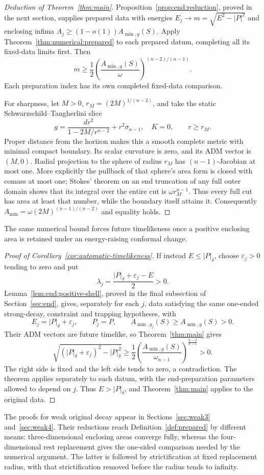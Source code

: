 \begin{proof}[Deduction of Theorem~\ref{thm:main}]
Proposition~\ref{prop:end:reduction}, proved in the next section,
supplies prepared data with energies $E_j\to
m=\sqrt{E^2-|P|^2}$ and enclosing infima
$A_j\ge(1-o(1))A_{\min,g}(S)$. Apply
Theorem~\ref{thm:numerical:prepared} to each prepared datum,
completing all its fixed-data limits first. Then
\[
 m\ge\frac12\left(\frac{A_{\min,g}(S)}\omega\right)^{(n-2)/(n-1)}.
\]
Each preparation index has its own completed fixed-data comparison.

For sharpness, let $M>0$, $r_M=(2M)^{1/(n-2)}$, and take the static
Schwarzschild--Tangherlini slice
\[
 g=\frac{dr^2}{1-2M/r^{n-2}}+r^2\sigma_{n-1},\quad K=0,
 \qquad r\ge r_M.
\]
Proper distance from the horizon makes this a smooth complete metric
with minimal compact boundary. Its scalar curvature is zero, and its
ADM vector is $(M,0)$. Radial projection to the sphere of radius $r_M$
has $(n-1)$-Jacobian at most one. More explicitly the pullback of that
sphere's area form is closed with comass at most one; Stokes' theorem
on an end truncation of any full outer domain shows that its integral
over the entire cut is $\omega r_M^{n-1}$. Thus every full cut has area
at least that number, while the boundary itself attains it. Consequently
$A_{\min}=\omega(2M)^{(n-1)/(n-2)}$ and equality holds.
\end{proof}

The same numerical bound forces future timelikeness once a positive
enclosing area is retained under an energy-raising conformal change.

\begin{proof}[Proof of Corollary~\ref{cor:automatic-timelikeness}]
If instead $E\le |P|_\delta$, choose $\varepsilon_j>0$ tending to zero
and put
\[
 \lambda_j=\frac{|P|_\delta+\varepsilon_j-E}{2}>0.
\]
Lemma~\ref{lem:end:positive-shell}, proved in the final subsection
of Section~\ref{sec:end}, gives, separately for each $j$,
data satisfying the same one-ended strong-decay, constraint and trapping
hypotheses, with
\[
 E_j=|P|_\delta+\varepsilon_j,\qquad P_j=P,\qquad
 A_{\min,g_j}(S)\ge A_{\min,g}(S)>0.
\]
Their ADM vectors are future timelike, so Theorem~\ref{thm:main} gives
\[
 \sqrt{(|P|_\delta+\varepsilon_j)^2-|P|_\delta^2}
 \ge \frac12\left(\frac{A_{\min,g}(S)}{\omega_{n-1}}\right)^{
                   \frac{n-2}{n-1}}>0.
\]
The right side is fixed and the left side tends to zero, a contradiction.
The theorem applies separately to each datum, with the end-preparation
parameters allowed to depend on $j$.
Thus $E>|P|_\delta$, and Theorem~\ref{thm:main} applies to the original data.
\end{proof}

The proofs for weak original decay appear in Sections~\ref{sec:weak3}
and~\ref{sec:weak4}. Their reductions reach Definition~\ref{def:prepared}
by different means: three-dimensional enclosing areas converge fully,
whereas the four-dimensional rest replacement gives the one-sided
comparison needed by the numerical argument. The latter is followed by
strictification at fixed replacement radius, with that strictification
removed before the radius tends to infinity.
